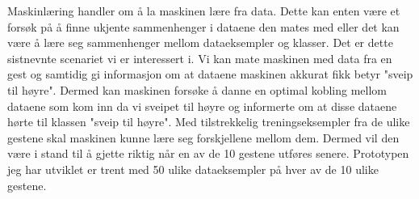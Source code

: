 Maskinlæring handler om å la maskinen lære fra data. Dette kan enten være et forsøk på å finne ukjente sammenhenger i dataene den mates med eller det kan være å lære seg sammenhenger mellom dataeksempler og klasser. Det er dette sistnevnte scenariet vi er interessert i. Vi kan mate maskinen med data fra en gest og samtidig gi informasjon om at dataene maskinen akkurat fikk betyr "sveip til høyre". Dermed kan maskinen forsøke å danne en optimal kobling mellom dataene som kom inn da vi sveipet til høyre og informerte om at disse dataene hørte til klassen "sveip til høyre". Med tilstrekkelig treningseksempler fra de ulike gestene skal maskinen kunne lære seg forskjellene mellom dem. Dermed vil den være i stand til å gjette riktig når en av de 10 gestene utføres senere. Prototypen jeg har utviklet er trent med 50 ulike dataeksempler på hver av de 10 ulike gestene.
